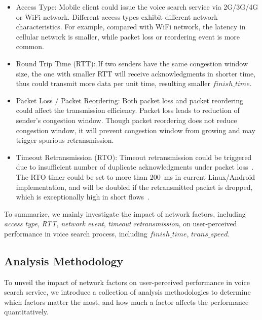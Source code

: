 \begin{itemize}
\setlength{\itemsep}{-8pt}
\setlength{\topsep}{-8pt}
	\item {Access Type: } Mobile client could issue the voice search service via 2G/3G/4G or WiFi network. Different access types exhibit different network characteristics. For example, compared with WiFi network, the latency in cellular network is smaller, while packet loss or reordering event is more common. \\
	\item {Round Trip Time (RTT): } If two senders have the same congestion window size, the one with smaller RTT will receive acknowledgments in shorter time, thus could transmit more data per unit time, resulting smaller $finish\_time$. \\
	\item {Packet Loss / Packet Reordering: } Both packet loss and packet reordering could affect the transmission efficiency. Packet loss leads to reduction of sender's congestion window. Though packet reordering does not reduce congestion window, it will prevent congestion window from growing and may trigger spurious retransmission. \\
	\item {Timeout Retransmission (RTO): } Timeout retransmission could be triggered due to insufficient number of duplicate acknowledgments under packet loss~\cite{rfc6675}. The RTO timer could be set to more than 200~ms in current Linux/Android implementation, and will be doubled if the retransmitted packet is dropped, which is exceptionally high in short flows~\cite{flach2013reducing}.\\
\end{itemize}

To summarize, we mainly investigate the impact of network factors, including \emph{access type}, \emph{RTT}, \emph{network event}, \emph{timeout retransmission}, on user-perceived performance in voice search process, including $finish\_time$, $trans\_speed$.

\subsection{Analysis Methodology}

To unveil the impact of network factors on user-perceived performance in voice search service, we introduce a collection of analysis methodologies to determine which factors matter the most, and how much a factor affects the performance quantitatively.

